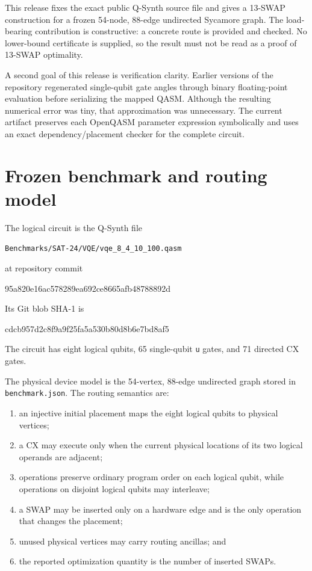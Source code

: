 \documentclass[11pt]{article}
\begin{document}
This release fixes the exact public Q-Synth source file and gives a 13-SWAP
construction for a frozen 54-node, 88-edge undirected Sycamore graph.  The
load-bearing contribution is constructive: a concrete route is provided and
checked.  No lower-bound certificate is supplied, so the result must not be
read as a proof of 13-SWAP optimality.

A second goal of this release is verification clarity.  Earlier versions of
the repository regenerated single-qubit gate angles through binary
floating-point evaluation before serializing the mapped QASM.  Although the
resulting numerical error was tiny, that approximation was unnecessary.  The
current artifact preserves each OpenQASM parameter expression symbolically and
uses an exact dependency/placement checker for the complete circuit.

\section{Frozen benchmark and routing model}

The logical circuit is the Q-Synth file
\begin{center}
\texttt{Benchmarks/SAT-24/VQE/vqe\_8\_4\_10\_100.qasm}
\end{center}
at repository commit
\begin{center}\scriptsize\ttfamily
95a820e16ac578289ea692ce8665afb48788892d
\end{center}
Its Git blob SHA-1 is
\begin{center}\scriptsize\ttfamily
cdcb957d2c8f9a9f25fa5a530b80d8b6e7bd8af5
\end{center}
The circuit has eight logical qubits, 65 single-qubit \texttt{u} gates, and
71 directed CX gates.

The physical device model is the 54-vertex, 88-edge undirected graph stored in
\texttt{benchmark.json}.  The routing semantics are:

\begin{enumerate}
  \item an injective initial placement maps the eight logical qubits to
        physical vertices;
  \item a CX may execute only when the current physical locations of its two
        logical operands are adjacent;
  \item operations preserve ordinary program order on each logical qubit,
        while operations on disjoint logical qubits may interleave;
  \item a SWAP may be inserted only on a hardware edge and is the only
        operation that changes the placement;
  \item unused physical vertices may carry routing ancillas; and
  \item the reported optimization quantity is the number of inserted SWAPs.
\end{enumerate}
\end{document}
